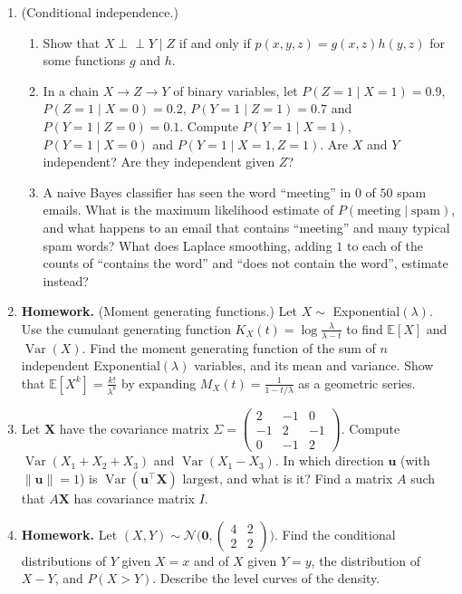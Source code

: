\documentclass[11pt]{article}
\newcommand{\homework}{\textcolor{red!70!black}{\textbf{Homework.}}}
\newcommand{\norm}[1]{\lVert #1 \rVert}
\newcommand{\E}{\mathbb{E}}
\newcommand{\indep}{\perp\!\!\!\perp}
\DeclareMathOperator{\Var}{Var}
\theoremstyle{definition}
\theoremstyle{plain}
\theoremstyle{remark}
\begin{document}
\begin{enumerate}[leftmargin=*]
\begin{enumerate}[label=(\alph*)]
    \end{enumerate}
    \item (Conditional independence.)
    \begin{enumerate}[label=(\alph*)]
        \item Show that $X \indep Y \mid Z$ if and only if $p(x, y, z) = g(x, z)h(y, z)$ for some functions $g$ and $h$.
        \item In a chain $X \to Z \to Y$ of binary variables, let $P(Z = 1 \mid X = 1) = 0.9$, $P(Z = 1 \mid X = 0) = 0.2$, $P(Y = 1 \mid Z = 1) = 0.7$ and $P(Y = 1 \mid Z = 0) = 0.1$. Compute $P(Y = 1 \mid X = 1)$, $P(Y = 1 \mid X = 0)$ and $P(Y = 1 \mid X = 1, Z = 1)$. Are $X$ and $Y$ independent? Are they independent given $Z$?
        \item A naive Bayes classifier has seen the word ``meeting'' in $0$ of $50$ spam emails. What is the maximum likelihood estimate of $P(\text{meeting} \mid \text{spam})$, and what happens to an email that contains ``meeting'' and many typical spam words? What does Laplace smoothing, adding $1$ to each of the counts of ``contains the word'' and ``does not contain the word'', estimate instead?
    \end{enumerate}
    \item \homework{} (Moment generating functions.) Let $X \sim$ Exponential$(\lambda)$. Use the cumulant generating function $K_X(t) = \log\frac{\lambda}{\lambda - t}$ to find $\E[X]$ and $\Var(X)$. Find the moment generating function of the sum of $n$ independent Exponential$(\lambda)$ variables, and its mean and variance. Show that $\E[X^k] = \frac{k!}{\lambda^k}$ by expanding $M_X(t) = \frac{1}{1 - t/\lambda}$ as a geometric series.
    \item Let $\mathbf{X}$ have the covariance matrix $\Sigma = \begin{pmatrix} 2 & -1 & 0 \\ -1 & 2 & -1 \\ 0 & -1 & 2 \end{pmatrix}$. Compute $\Var(X_1 + X_2 + X_3)$ and $\Var(X_1 - X_3)$. In which direction $\mathbf{u}$ (with $\norm{\mathbf{u}} = 1$) is $\Var(\mathbf{u}^\top\mathbf{X})$ largest, and what is it? Find a matrix $A$ such that $A\mathbf{X}$ has covariance matrix $I$.
    \item \homework{} Let $(X, Y) \sim \mathcal{N}\Big(\mathbf{0}, \begin{pmatrix} 4 & 2 \\ 2 & 2 \end{pmatrix}\Big)$. Find the conditional distributions of $Y$ given $X = x$ and of $X$ given $Y = y$, the distribution of $X - Y$, and $P(X > Y)$. Describe the level curves of the density.

\end{enumerate}
\end{document}
